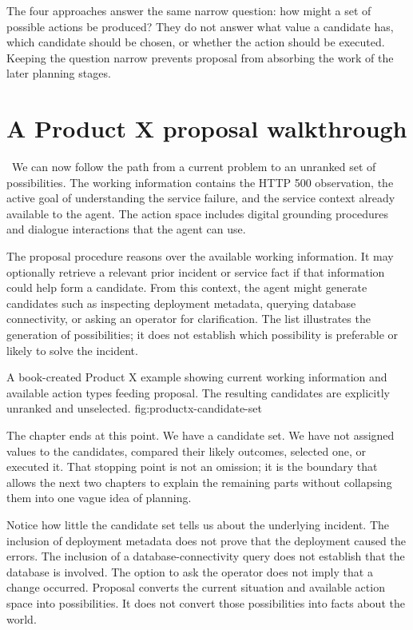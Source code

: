 The four approaches answer the same narrow question: how might a set of possible actions be produced? They do not answer what value a candidate has, which candidate should be chosen, or whether the action should be executed. Keeping the question narrow prevents proposal from absorbing the work of the later planning stages.

\section{A Product X proposal walkthrough}
\label{sec:productx-proposal}

\BookExampleLabel\ We can now follow the path from a current problem to an unranked set of possibilities. The working information contains the HTTP 500 observation, the active goal of understanding the service failure, and the service context already available to the agent. The action space includes digital grounding procedures and dialogue interactions that the agent can use.

The proposal procedure reasons over the available working information. It may optionally retrieve a relevant prior incident or service fact if that information could help form a candidate. From this context, the agent might generate candidates such as inspecting deployment metadata, querying database connectivity, or asking an operator for clarification. The list illustrates the generation of possibilities; it does not establish which possibility is preferable or likely to solve the incident.

  {A book-created Product X example showing current working information and available action types feeding proposal. The resulting candidates are explicitly unranked and unselected.}
  {fig:productx-candidate-set}

The chapter ends at this point. We have a candidate set. We have not assigned values to the candidates, compared their likely outcomes, selected one, or executed it. That stopping point is not an omission; it is the boundary that allows the next two chapters to explain the remaining parts without collapsing them into one vague idea of planning.


Notice how little the candidate set tells us about the underlying incident. The inclusion of deployment metadata does not prove that the deployment caused the errors. The inclusion of a database-connectivity query does not establish that the database is involved. The option to ask the operator does not imply that a change occurred. Proposal converts the current situation and available action space into possibilities. It does not convert those possibilities into facts about the world.

